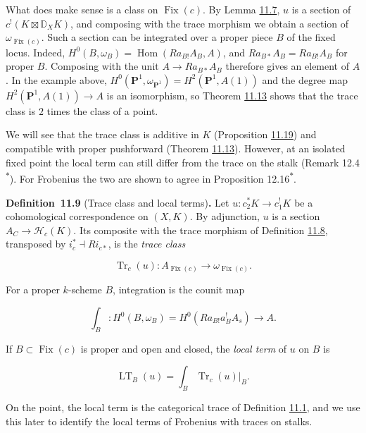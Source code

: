\documentclass[11pt]{article}
\newenvironment{bpstatement}[2]{\par\addvspace{0.6\baselineskip}\noindent\textbf{#1}#2\textbf{.}\enspace\ignorespaces}
  {\par\addvspace{0.4\baselineskip}}
\newcommand{\bpout}[1]{#1\textsuperscript{\hyperlink{bp-outside}{\ensuremath{\ast}}}}
\providecommand{\Fix}{}\renewcommand{\Fix}{\operatorname{Fix}}
\begin{document}
What does make sense is a class on \(\Fix(c)\). By Lemma \hyperref[bp22]{11.7}, \(u\) is a section of \(c^!(K\boxtimes\mathbb D_XK)\), and composing with the trace morphism we obtain a section of \(\omega_{\Fix(c)}\). Such a section can be integrated over a proper piece \(B\) of the fixed locus. Indeed, \(H^0(B,\omega_B)=\operatorname{Hom}(Ra_{B!}A_B,A)\), and \(Ra_{B*}A_B=Ra_{B!}A_B\) for proper \(B\). Composing with the unit \(A\to Ra_{B*}A_B\) therefore gives an element of \(A\). In the example above, \(H^0(\mathbf P^1,\omega_{\mathbf P^1})=H^2(\mathbf P^1,A(1))\) and the degree map \(H^2(\mathbf P^1,A(1))\to A\) is an isomorphism, so Theorem \hyperref[bp37]{11.13} shows that the trace class is \(2\) times the class of a point.

We will see that the trace class is additive in \(K\) (Proposition \hyperref[bp54]{11.19}) and compatible with proper pushforward (Theorem \hyperref[bp37]{11.13}). However, at an isolated fixed point the local term can still differ from the trace on the stalk (Remark \bpout{12.4}). For Frobenius the two are shown to agree in Proposition \bpout{12.16}.

\label{bp28}%
\begin{bpstatement}{Definition~11.9}{ (Trace class and local terms)}
Let \(u:c_2^*K\to c_1^!K\) be a cohomological correspondence on \((X,K)\). By adjunction, \(u\) is a section \(A_C\to\mathcal H_c(K)\). Its composite with the trace morphism of Definition \hyperref[bp25]{11.8}, transposed by \(i_c^*\dashv Ri_{c*}\), is the \emph{trace class}

\[
\operatorname{Tr}_c(u):A_{\Fix(c)}\longrightarrow\omega_{\Fix(c)}.
\]

For a proper \(k\)-scheme \(B\), integration is the counit map

\[
\int_B:H^0(B,\omega_B)
=H^0(Ra_{B!}a_B^!A_s)\longrightarrow A.
\]

If \(B\subset \Fix(c)\) is proper and open and closed, the \emph{local term} of \(u\) on \(B\) is

\[
\operatorname{LT}_B(u)=\int_B\operatorname{Tr}_c(u)|_B.
\]
\end{bpstatement}

\label{bp29}%
On the point, the local term is the categorical trace of Definition \hyperref[bp5]{11.1}, and we use this later to identify the local terms of Frobenius with traces on stalks.
\end{document}
